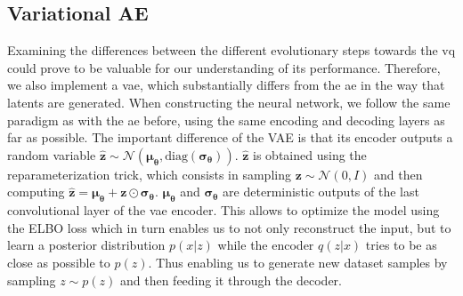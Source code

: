 \subsection{Variational AE}\label{subsec:variational-ae}
Examining the differences between the different evolutionary steps towards the \ac{vq} could prove to be valuable
for our understanding of its performance.
Therefore, we also implement a \ac{vae}, which substantially differs from the \ac{ae} in the way that latents are
generated.
When constructing the neural network, we follow the same paradigm as with the \ac{ae} before, using the same
encoding and decoding layers as far as possible.
The important difference of the VAE is that its encoder outputs a random variable
$\boldsymbol{\hat{z}} \sim \mathcal{N}(\boldsymbol{\mu_\theta}, \text{diag}
(\boldsymbol{\sigma_\theta}))$. $\boldsymbol{\hat{z}}$ is obtained using the
reparameterization trick, which consists in sampling $\boldsymbol{z}
\sim \mathcal{N}(0, I)$ and then computing $\boldsymbol{\hat{z}} =
\boldsymbol{\mu_\theta} + \boldsymbol{z} \odot \boldsymbol{\sigma_\theta}$.
$\boldsymbol{\mu_\theta}$ and $\boldsymbol{\sigma_\theta}$ are deterministic
outputs of the last convolutional layer of the \ac{vae} encoder.
This allows to optimize the model using the ELBO loss which in turn enables us to not only
reconstruct the input, but to learn a posterior distribution $p(x|z)$ while
the encoder $q(z|x)$ tries to be as close as possible to $p(z)$.
Thus enabling us to generate new dataset samples by sampling $z \sim p(z)$ and then feeding
it through the decoder.